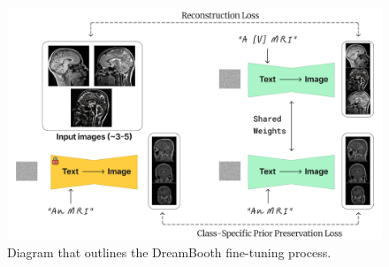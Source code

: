 \begin{figure}[H] 
\centering
\includegraphics[width=\columnwidth]{main/content/images/diagrams/db_diagram.png}
\caption{Diagram that outlines the DreamBooth fine-tuning process.}
\label{fig:dreambooth_diagram}
\end{figure}